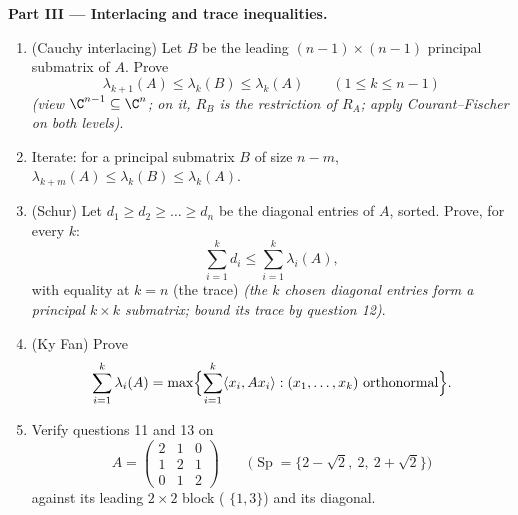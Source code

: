 \begin{problem}
\medskip
\noindent\textbf{Part III --- Interlacing and trace
inequalities.}
\begin{enumerate}[resume]
  \item (Cauchy interlacing) Let $B$ be the leading $(n-1)
        \times(n-1)$ principal submatrix of $A$. Prove
        \[
        \lambda_{k+1}(A) \leq \lambda_k(B) \leq \lambda_k(A)
        \qquad (1 \leq k \leq n-1)
        \]
        \emph{(view $\C^{n-1} \subseteq \C^n$; on it, $R_B$ is
        the restriction of $R_A$; apply Courant--Fischer on
        both levels)}.
  \item Iterate: for a principal submatrix $B$ of size $n - m$,
        $\lambda_{k+m}(A) \leq \lambda_k(B) \leq
        \lambda_k(A)$.
  \item (Schur) Let $d_1 \geq d_2 \geq \dots \geq d_n$ be the
        diagonal entries of $A$, sorted. Prove, for every $k$:
        \[
        \sum_{i=1}^{k} d_i \leq \sum_{i=1}^{k}\lambda_i(A),
        \]
        with equality at $k = n$ (the trace)
        \emph{(the $k$ chosen diagonal entries form a
        principal $k\times k$ submatrix; bound its trace by
        question 12)}.
  \item (Ky Fan) Prove
        \[
        \sum_{i=1}^{k}\lambda_i(A)
        = \max\Bigl\{\sum_{i=1}^{k}\langle x_i, Ax_i\rangle
        : (x_1, \dots, x_k) \text{ orthonormal}\Bigr\} .
        \]
  \item Verify questions 11 and 13 on
        \[
        A = \begin{pmatrix} 2 & 1 & 0\\ 1 & 2 & 1\\
        0 & 1 & 2\end{pmatrix}
        \qquad
        \bigl(\operatorname{Sp} = \{2 - \sqrt2,\ 2,\
        2+\sqrt2\}\bigr)
        \]
        against its leading $2\times2$ block ( $\{1,
        3\}$) and its diagonal.
\end{enumerate}


\end{problem}
